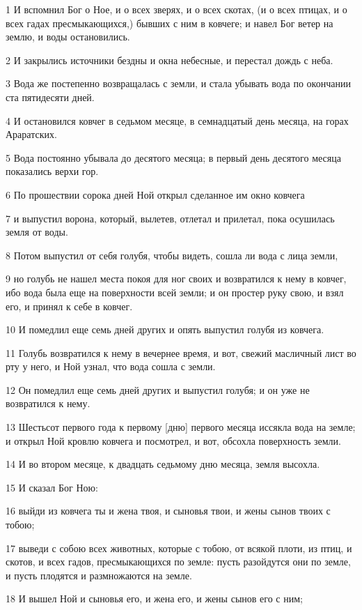 \par 1 И вспомнил Бог о Ное, и о всех зверях, и о всех скотах, (и о всех птицах, и о всех гадах пресмыкающихся,) бывших с ним в ковчеге; и навел Бог ветер на землю, и воды остановились.
\par 2 И закрылись источники бездны и окна небесные, и перестал дождь с неба.
\par 3 Вода же постепенно возвращалась с земли, и стала убывать вода по окончании ста пятидесяти дней.
\par 4 И остановился ковчег в седьмом месяце, в семнадцатый день месяца, на горах Араратских.
\par 5 Вода постоянно убывала до десятого месяца; в первый день десятого месяца показались верхи гор.
\par 6 По прошествии сорока дней Ной открыл сделанное им окно ковчега
\par 7 и выпустил ворона, который, вылетев, отлетал и прилетал, пока осушилась земля от воды.
\par 8 Потом выпустил от себя голубя, чтобы видеть, сошла ли вода с лица земли,
\par 9 но голубь не нашел места покоя для ног своих и возвратился к нему в ковчег, ибо вода была еще на поверхности всей земли; и он простер руку свою, и взял его, и принял к себе в ковчег.
\par 10 И помедлил еще семь дней других и опять выпустил голубя из ковчега.
\par 11 Голубь возвратился к нему в вечернее время, и вот, свежий масличный лист во рту у него, и Ной узнал, что вода сошла с земли.
\par 12 Он помедлил еще семь дней других и выпустил голубя; и он уже не возвратился к нему.
\par 13 Шестьсот первого года к первому [дню] первого месяца иссякла вода на земле; и открыл Ной кровлю ковчега и посмотрел, и вот, обсохла поверхность земли.
\par 14 И во втором месяце, к двадцать седьмому дню месяца, земля высохла.
\par 15 И сказал Бог Ною:
\par 16 выйди из ковчега ты и жена твоя, и сыновья твои, и жены сынов твоих с тобою;
\par 17 выведи с собою всех животных, которые с тобою, от всякой плоти, из птиц, и скотов, и всех гадов, пресмыкающихся по земле: пусть разойдутся они по земле, и пусть плодятся и размножаются на земле.
\par 18 И вышел Ной и сыновья его, и жена его, и жены сынов его с ним;
